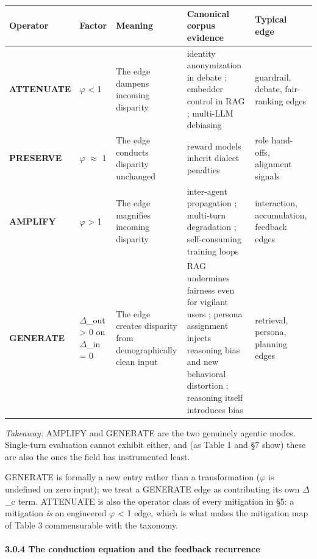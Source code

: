 \documentclass[10pt]{article}
\begin{document}
\begin{center}\footnotesize
\begin{longtable}{|p{}|p{}|p{}|p{}|p{}|}
\hline \textbf{Operator} & \textbf{Factor} & \textbf{Meaning} & \textbf{Canonical corpus evidence} & \textbf{Typical edge} \\ \hline\endhead
\textbf{ATTENUATE} & $\varphi$ < 1 & The edge dampens incoming disparity & identity anonymization in debate \cite{choi2025identity}; embedder control in RAG \cite{kim2025mitigating}; multi-LLM debiasing \cite{owens2024multi} & guardrail, debate, fair-ranking edges \\ \hline
\textbf{PRESERVE} & $\varphi$ $\approx$ 1 & The edge conducts disparity unchanged & reward models inherit dialect penalties \cite{mire2025rejected} & role hand-offs, alignment signals \\ \hline
\textbf{AMPLIFY} & $\varphi$ > 1 & The edge magnifies incoming disparity & inter-agent propagation \cite{nguyen2025social}; multi-turn degradation \cite{fan2024fairmt}; self-consuming training loops \cite{wyllie2024fairness} & interaction, accumulation, feedback edges \\ \hline
\textbf{GENERATE} & $\Delta$\_out > 0 on $\Delta$\_in = 0 & The edge creates disparity from demographically clean input & RAG undermines fairness even for vigilant users \cite{hu2024free}; persona assignment injects reasoning bias and new behavioral distortion \cite{gupta2023bias,cao2026from}; reasoning itself introduces bias \cite{wu2025reasoning} & retrieval, persona, planning edges \\ \hline
\end{longtable}\end{center}

\emph{Takeaway:} AMPLIFY and GENERATE are the two genuinely agentic modes. Single-turn evaluation cannot exhibit either, and (as Table 1 and \S{}7 show) these are also the ones the field has instrumented least.

GENERATE is formally a new entry rather than a transformation ($\varphi$ is undefined on zero input); we treat a GENERATE edge as contributing its own $\Delta$\_c term. ATTENUATE is also the operator class of every mitigation in \S{}5: a mitigation \emph{is} an engineered $\varphi$ < 1 edge, which is what makes the mitigation map of Table 3 commensurable with the taxonomy.

\paragraph*{3.0.4 The conduction equation and the feedback recurrence}
\end{document}
